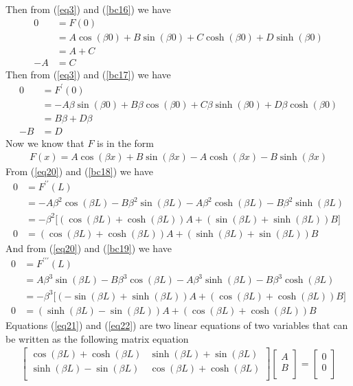 \documentclass[12pt]{article}
\begin{document}
	Then from (\ref{eq3}) and (\ref{bc16}) we have
	\begin{align*}
		0 &= F(0) \\
		& = A \cos(\beta 0) + B \sin(\beta 0) + C \cosh(\beta 0) + D \sinh(\beta 0) \\
		& = A + C \\
		-A & = C
	\end{align*}
	Then from (\ref{eq3}) and (\ref{bc17}) we have
	\begin{align*}
		0 &= F^\prime(0) \\
		& = -A \beta \sin(\beta 0) + B \beta \cos(\beta 0) + C \beta \sinh(\beta 0) + D \beta \cosh(\beta 0) \\
		& = B \beta + D \beta \\
		-B & = D
	\end{align*}
	Now we know that $F$ is in the form
	\begin{align}
		F(x) = A \cos(\beta x) + B \sin(\beta x) - A \cosh(\beta x) - B \sinh(\beta x) \label{eq20}
	\end{align}
	From (\ref{eq20}) and (\ref{bc18}) we have
	\begin{align}
		0 &= F^{\prime\prime}(L) \nonumber \\
		& = -A \beta^2 \cos(\beta L) - B \beta^2 \sin(\beta L) - A \beta^2 \cosh(\beta L) - B \beta^2 \sinh(\beta L) \nonumber \\
		& = -\beta^2 \big[  (\cos(\beta L) + \cosh(\beta L))A + (\sin(\beta L) + \sinh(\beta L))B  \big] \nonumber \\
		0 & = (\cos(\beta L) + \cosh(\beta L))A + (\sinh(\beta L) + \sin(\beta L))B \label{eq21}
	\end{align}
	And from (\ref{eq20}) and (\ref{bc19}) we have
	\begin{align}
		0 &= F^{\prime\prime\prime}(L) \nonumber \\
		& = A \beta^3 \sin(\beta L) - B \beta^3 \cos(\beta L) - A \beta^3 \sinh(\beta L) - B \beta^3 \cosh(\beta L) \nonumber \\
		& = -\beta^3 \big[  ( -\sin(\beta L) + \sinh(\beta L))A + (\cos(\beta L) + \cosh(\beta L))B  \big] \nonumber \\
		0 & = (\sinh(\beta L) - \sin(\beta L))A + (\cos(\beta L) + \cosh(\beta L))B \label{eq22}
	\end{align}
	Equations (\ref{eq21}) and (\ref{eq22}) are two linear equations of two variables that can be written as the following matrix equation
	\begin{align}
		\begin{bmatrix}
		\cos(\beta L) + \cosh(\beta L) & \sinh(\beta L) + \sin(\beta L)\\
		\sinh(\beta L) - \sin(\beta L) & \cos(\beta L) + \cosh(\beta L)\\
		\end{bmatrix}
		\begin{bmatrix}
		A \\
		B\\
		\end{bmatrix}
		=
		\begin{bmatrix}
		0 \\
		0\\
		\end{bmatrix} \label{eq23}
	\end{align}
\end{document}
